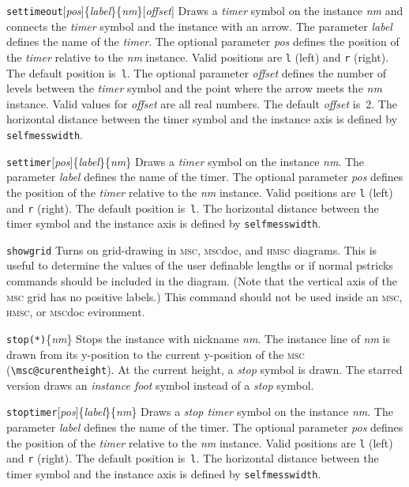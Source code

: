 \documentclass[a4paper]{article}
\newcommand{\cmd}[1]{\texttt{\bslash #1}}
\newcommand{\acro}[1]{{\scshape\lowercase{#1}}}
\newcommand\MSC{\acro{MSC}}
\newcommand\HMSC{\acro{HMSC}}
\newcommand{\MSCdoc}{\MSC{}doc}
\newcommand{\opt}[1]{[#1]}
\newenvironment{defs}{%
  \begin{list}{}%
              {\setlength{\labelwidth}{0pt}%
               \setlength{\labelsep}{1em}%
               \setlength{\leftmargin}{1em}%
               \setlength{\parsep}{1ex}%
               \setlength{\listparindent}{0pt}%
               \setlength{\rightmargin}{0pt}%
               \renewcommand{\makelabel}[1]{##1}%
               \raggedright%
              }%
  }{%
  \end{list}}
\begin{document}
\begin{defs}
\item[\cmd{settimeout}\opt{\emph{pos}}\{\emph{label}\}\{\emph{nm}\}\opt{\emph{offset}}]
Draws a \emph{timer} symbol on the instance \emph{nm} and connects the
\emph{timer} symbol and the instance with an arrow. The parameter
\emph{label} defines the name of the \emph{timer}. The optional
parameter \emph{pos} defines the position of the \emph{timer} relative
to the \emph{nm} instance. Valid positions are \verb|l| (left) and
\verb|r| (right). The default position is~\verb|l|. The optional
parameter \emph{offset} defines the number of levels between the
\emph{timer} symbol and the point where the arrow meets the \emph{nm}
instance. Valid values for \emph{offset} are all real numbers. The 
default \emph{offset} is~2. The horizontal distance
between the timer symbol and the instance axis is defined by
\verb+selfmesswidth+.

\item[\cmd{settimer}\opt{\emph{pos}}\{\emph{label}\}\{\emph{nm}\}]
Draws a \emph{timer} symbol on the instance \emph{nm}. The parameter
\emph{label} defines the name of the timer. The optional parameter
\emph{pos} defines the position of the \emph{timer} relative to the
\emph{nm} instance. Valid positions are \verb|l| (left) and \verb|r|
(right). The default position is~\verb|l|. The horizontal distance
between the timer symbol and the instance axis is defined by
\verb+selfmesswidth+.

\item[\cmd{showgrid}] Turns on grid-drawing in \MSC, \MSCdoc, and \HMSC{}
diagrams. This is useful to determine the values of the user definable
lengths or if normal \textsf{pstricks} commands should be included in
the diagram. (Note that the vertical axis of the \MSC{} grid has no positive
labels.) This command should not be used inside an \MSC,
\HMSC, or \MSCdoc{} evironment.

\item[\cmd{stop(*)}\{\emph{nm}\}] Stops the instance with nickname
\emph{nm}. The instance line of \emph{nm} is drawn from its y-position
to the current y-position of the \MSC{} (\verb|\msc@curentheight|). At
the current height, a \emph{stop} symbol is drawn. The starred version
draws an \emph{instance foot} symbol instead of a \emph{stop} symbol. 

\item[\cmd{stoptimer}\opt{\emph{pos}}\{\emph{label}\}\{\emph{nm}\}]
Draws a \emph{stop timer} symbol on the instance \emph{nm}. The
parameter \emph{label} defines the name of the timer. The optional
parameter \emph{pos} defines the position of the \emph{timer} relative
to the \emph{nm} instance. Valid positions are \verb|l| (left) and
\verb|r| (right). The default position is~\verb|l|. The horizontal
distance between the timer symbol and the instance axis is defined by
\verb+selfmesswidth+.


\end{defs}
\end{document}
